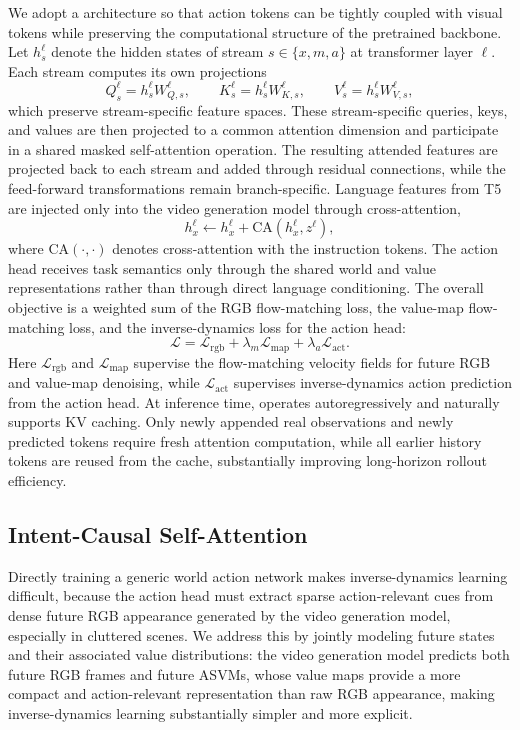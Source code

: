 We adopt a \mot architecture so that action tokens can be tightly coupled with visual tokens while preserving the computational structure of the pretrained backbone. Let $h_s^\ell$ denote the hidden states of stream $s \in \{x,m,a\}$ at transformer layer $\ell$. Each stream computes its own projections
\begin{equation}
Q_s^\ell = h_s^\ell W_{Q,s}^\ell,\qquad
K_s^\ell = h_s^\ell W_{K,s}^\ell,\qquad
V_s^\ell = h_s^\ell W_{V,s}^\ell,
\end{equation}
which preserve stream-specific feature spaces. These stream-specific queries, keys, and values are then projected to a common attention dimension and participate in a shared masked self-attention operation. The resulting attended features are projected back to each stream and added through residual connections, while the feed-forward transformations remain branch-specific. Language features from T5 are injected only into the video generation model through cross-attention,
\begin{equation}
h_x^\ell \leftarrow h_x^\ell + \mathrm{CA}(h_x^\ell, z^{\ell}),
\end{equation}
where $\mathrm{CA}(\cdot,\cdot)$ denotes cross-attention with the instruction tokens. The action head receives task semantics only through the shared world and value representations rather than through direct language conditioning. The overall objective is a weighted sum of the RGB flow-matching loss, the value-map flow-matching loss, and the inverse-dynamics loss for the action head:
\begin{equation}
\mathcal{L} = \mathcal{L}_{\mathrm{rgb}} + \lambda_m \mathcal{L}_{\mathrm{map}} + \lambda_a \mathcal{L}_{\mathrm{act}}.
\end{equation}
Here $\mathcal{L}_{\mathrm{rgb}}$ and $\mathcal{L}_{\mathrm{map}}$ supervise the flow-matching velocity fields for future RGB and value-map denoising, while $\mathcal{L}_{\mathrm{act}}$ supervises inverse-dynamics action prediction from the action head. At inference time, \method operates autoregressively and naturally supports KV caching. Only newly appended real observations and newly predicted tokens require fresh attention computation, while all earlier history tokens are reused from the cache, substantially improving long-horizon rollout efficiency.




\subsection{Intent-Causal Self-Attention}
Directly training a generic \mot world action network makes inverse-dynamics learning difficult, because the action head must extract sparse action-relevant cues from dense future RGB appearance generated by the video generation model, especially in cluttered scenes. We address this by jointly modeling future states and their associated value distributions: the video generation model predicts both future RGB frames and future ASVMs, whose value maps provide a more compact and action-relevant representation than raw RGB appearance, making inverse-dynamics learning substantially simpler and more explicit.


